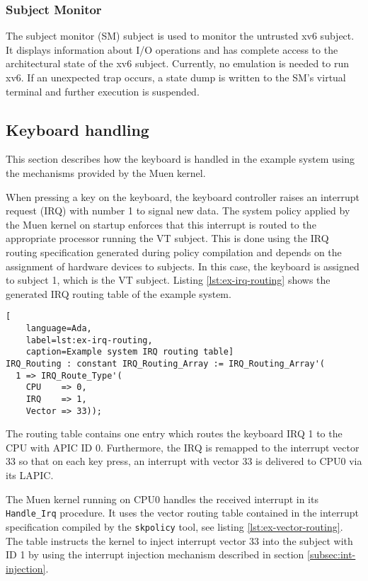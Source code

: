 \subsubsection{Subject Monitor}
The subject monitor (SM) subject is used to monitor the untrusted xv6
subject. It displays information about I/O operations and has complete access to
the architectural state of the xv6 subject. Currently, no emulation is needed to
run xv6. If an unexpected trap occurs, a state dump is written to the SM's
virtual terminal and further execution is suspended.

\subsection{Keyboard handling}\label{subsec:keyboard-handling}
This section describes how the keyboard is handled in the example system using
the mechanisms provided by the Muen kernel.

When pressing a key on the keyboard, the keyboard controller raises an interrupt
request (IRQ) with number 1 to signal new data. The system policy
applied by the Muen kernel on startup enforces that this interrupt is routed to
the appropriate processor running the VT subject. This is done using the IRQ
routing specification generated during policy compilation and depends on the
assignment of hardware devices to subjects. In this case, the keyboard is
assigned to subject 1, which is the VT subject. Listing \ref{lst:ex-irq-routing}
shows the generated IRQ routing table of the example system.

\begin{lstlisting}[
	language=Ada,
	label=lst:ex-irq-routing,
	caption=Example system IRQ routing table]
IRQ_Routing : constant IRQ_Routing_Array := IRQ_Routing_Array'(
  1 => IRQ_Route_Type'(
    CPU    => 0,
    IRQ    => 1,
    Vector => 33));
\end{lstlisting}

The routing table contains one entry which routes the keyboard IRQ 1 to the CPU
with APIC ID 0. Furthermore, the IRQ is remapped to the interrupt vector 33 so
that on each key press, an interrupt with vector 33 is delivered to CPU0 via its
LAPIC.

The Muen kernel running on CPU0 handles the received interrupt in its
\texttt{Handle\_Irq} procedure. It uses the vector routing table contained in
the interrupt specification compiled by the \texttt{skpolicy} tool, see listing
\ref{lst:ex-vector-routing}. The table instructs the kernel to inject interrupt
vector 33 into the subject with ID 1 by using the interrupt injection mechanism
described in section \ref{subsec:int-injection}.

